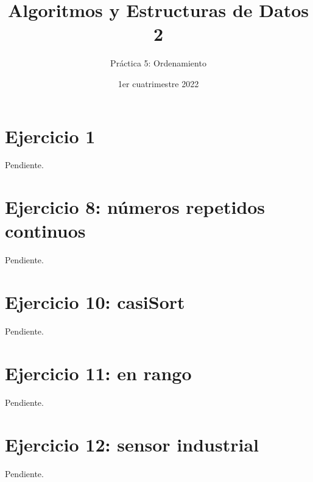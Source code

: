

\title{Algoritmos y Estructuras de Datos 2}
\author{Práctica 5: Ordenamiento}
\date{1er cuatrimestre 2022}



\maketitle
\tableofcontents
\newpage

\section{Ejercicio 1}

Pendiente.








\section{Ejercicio 8: números repetidos continuos}

Pendiente.



\section{Ejercicio 10: casiSort}

Pendiente.

\section{Ejercicio 11: en rango}

Pendiente.

\section{Ejercicio 12: sensor industrial}

Pendiente.










